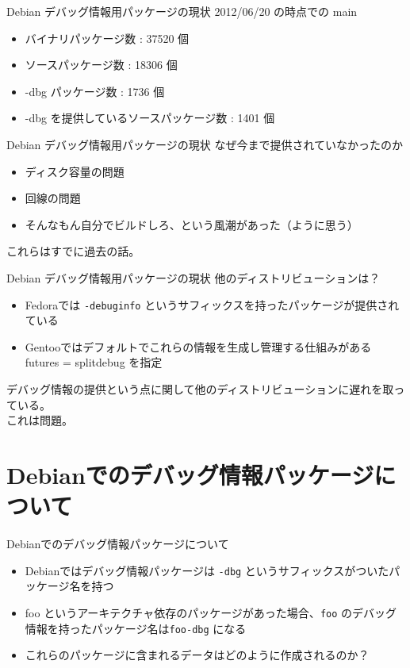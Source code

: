 \begin{frame}{Debian デバッグ情報用パッケージの現状}
2012/06/20 の時点での main
\begin{itemize}
\item バイナリパッケージ数 : 37520 個
\item ソースパッケージ数   : 18306 個
\item -dbg パッケージ数    : 1736 個
\item -dbg を提供しているソースパッケージ数 : 1401 個
\end{itemize}
\end{frame}

\begin{frame}{Debian デバッグ情報用パッケージの現状}
なぜ今まで提供されていなかったのか
\pause
\begin{itemize}
\item ディスク容量の問題
\item 回線の問題
\item そんなもん自分でビルドしろ、という風潮があった（ように思う）
\end{itemize}
これらはすでに過去の話。
\end{frame}

\begin{frame}{Debian デバッグ情報用パッケージの現状}
他のディストリビューションは？
\pause
\begin{itemize}
\item Fedoraでは \texttt{-debuginfo} というサフィックスを持ったパッケージが提供されている
\item Gentooではデフォルトでこれらの情報を生成し管理する仕組みがある
futures = splitdebug を指定
\end{itemize}
デバッグ情報の提供という点に関して他のディストリビューションに遅れを取っている。\\
\pause
これは問題。
\end{frame}

\section{Debianでのデバッグ情報パッケージについて}

\begin{frame}{Debianでのデバッグ情報パッケージについて}
\begin{itemize}[<+->]
\item Debianではデバッグ情報パッケージは \texttt{-dbg} というサフィックスがついたパッケージ名を持つ
\item foo というアーキテクチャ依存のパッケージがあった場合、\texttt{foo} のデバッグ情報を持ったパッケージ名は\texttt{foo-dbg} になる
\item これらのパッケージに含まれるデータはどのように作成されるのか？
\end{itemize}
\end{frame}

